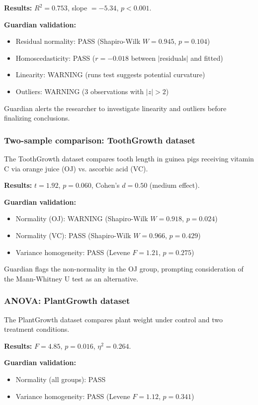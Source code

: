 \documentclass[article]{jss}
\begin{document}
\textbf{Results:} $R^2 = 0.753$, slope $= -5.34$, $p < 0.001$.

\textbf{Guardian validation:}
\begin{itemize}
\item Residual normality: PASS (Shapiro-Wilk $W = 0.945$, $p = 0.104$)
\item Homoscedasticity: PASS ($r = -0.018$ between $|$residuals$|$ and fitted)
\item Linearity: WARNING (runs test suggests potential curvature)
\item Outliers: WARNING (3 observations with $|z| > 2$)
\end{itemize}

Guardian alerts the researcher to investigate linearity and outliers before finalizing conclusions.

\subsubsection{Two-sample comparison: ToothGrowth dataset}

The ToothGrowth dataset compares tooth length in guinea pigs receiving vitamin C via orange juice (OJ) vs. ascorbic acid (VC).

\textbf{Results:} $t = 1.92$, $p = 0.060$, Cohen's $d = 0.50$ (medium effect).

\textbf{Guardian validation:}
\begin{itemize}
\item Normality (OJ): WARNING (Shapiro-Wilk $W = 0.918$, $p = 0.024$)
\item Normality (VC): PASS (Shapiro-Wilk $W = 0.966$, $p = 0.429$)
\item Variance homogeneity: PASS (Levene $F = 1.21$, $p = 0.275$)
\end{itemize}

Guardian flags the non-normality in the OJ group, prompting consideration of the Mann-Whitney U test as an alternative.

\subsubsection{ANOVA: PlantGrowth dataset}

The PlantGrowth dataset compares plant weight under control and two treatment conditions.

\textbf{Results:} $F = 4.85$, $p = 0.016$, $\eta^2 = 0.264$.

\textbf{Guardian validation:}
\begin{itemize}
\item Normality (all groups): PASS
\item Variance homogeneity: PASS (Levene $F = 1.12$, $p = 0.341$)
\end{itemize}
\end{document}
